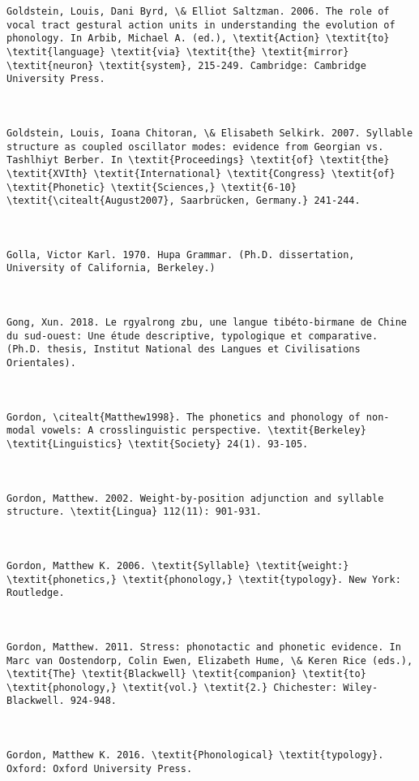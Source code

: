 \begin{verbatim}
Goldstein, Louis, Dani Byrd, \& Elliot Saltzman. 2006. The role of vocal tract gestural action units in understanding the evolution of phonology. In Arbib, Michael A. (ed.), \textit{Action} \textit{to} \textit{language} \textit{via} \textit{the} \textit{mirror} \textit{neuron} \textit{system}, 215-249. Cambridge: Cambridge University Press.



Goldstein, Louis, Ioana Chitoran, \& Elisabeth Selkirk. 2007. Syllable structure as coupled oscillator modes: evidence from Georgian vs. Tashlhiyt Berber. In \textit{Proceedings} \textit{of} \textit{the} \textit{XVIth} \textit{International} \textit{Congress} \textit{of} \textit{Phonetic} \textit{Sciences,} \textit{6-10} \textit{\citealt{August2007}, Saarbrücken, Germany.} 241-244.



Golla, Victor Karl. 1970. Hupa Grammar. (Ph.D. dissertation, University of California, Berkeley.)



Gong, Xun. 2018. Le rgyalrong zbu, une langue tibéto-birmane de Chine du sud-ouest: Une étude descriptive, typologique et comparative. (Ph.D. thesis, Institut National des Langues et Civilisations Orientales).



Gordon, \citealt{Matthew1998}. The phonetics and phonology of non-modal vowels: A crosslinguistic perspective. \textit{Berkeley} \textit{Linguistics} \textit{Society} 24(1). 93-105.



Gordon, Matthew. 2002. Weight-by-position adjunction and syllable structure. \textit{Lingua} 112(11): 901-931.



Gordon, Matthew K. 2006. \textit{Syllable} \textit{weight:} \textit{phonetics,} \textit{phonology,} \textit{typology}. New York: Routledge.



Gordon, Matthew. 2011. Stress: phonotactic and phonetic evidence. In Marc van Oostendorp, Colin Ewen, Elizabeth Hume, \& Keren Rice (eds.), \textit{The} \textit{Blackwell} \textit{companion} \textit{to} \textit{phonology,} \textit{vol.} \textit{2.} Chichester: Wiley-Blackwell. 924-948.



Gordon, Matthew K. 2016. \textit{Phonological} \textit{typology}. Oxford: Oxford University Press.




\end{verbatim}
